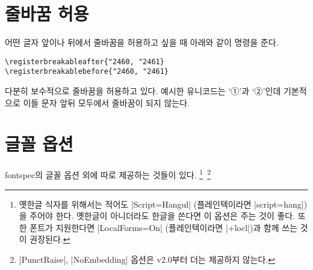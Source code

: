 \documentclass[a4paper]{article}
\def\luatex{\hologo{LuaTeX}}
\def\logoko{\textsf{k}\kern-.0625em\textit{o}}
\def\luatexko{\luatex-\logoko}
\begin{document}
\section{줄바꿈 허용}\label{sec:break}

어떤 글자 앞이나 뒤에서 줄바꿈을 허용하고 싶을 때 아래와 같이 명령을 준다.%
\pkgkwd*{\registerbreakableafter}%
\pkgkwd*{\registerbreakablebefore}
\begin{verbatim}
\registerbreakableafter{"2460, "2461}
\registerbreakablebefore{"2460, "2461}
\end{verbatim}
 다분히 보수적으로 줄바꿈을 허용하고 있다.
예시한 유니코드는 `①'과 `②'인데 기본적으로
이들 문자 앞뒤 모두에서 줄바꿈이 되지 않는다.

\section{글꼴 옵션}\label{sec:fontoption}

fontspec의 글꼴 옵션 외에  따로 제공하는 것들이 있다.%
\footnote{%
  옛한글 식자를 위해서는 적어도 |Script=Hangul|
  (플레인텍이라면 |script=hang|)을 주어야 한다.
  옛한글이 아니더라도 한글을 쓴다면 이 옵션은 주는 것이 좋다.
  또한 폰트가 지원한다면 |LocalForms=On| (플레인텍이라면 |+locl|)과
  함께 쓰는 것이 권장된다. }\,%
\footnote{%
  |PunctRaise|, |NoEmbedding| 옵션은 v2.0부터 더는 제공하지 않는다. }

\def\hunmintxt{%
  \noindent\textbf{%
  世솅〮宗조ᇰ御ᅌᅥᆼ〮製졩〮訓훈〮民민正져ᇰ〮音ᅙᅳᆷ
  }\par
  製졩〮ᄂᆞᆫ〮글〮지ᅀᅳᆯ〮씨〮니〮御ᅌᅥᆼ〮製졩〮ᄂᆞᆫ〮님〯금〮지〯ᅀᅳ샨〮그〮리라〮訓훈〮은〮ᄀᆞᄅᆞ칠〮씨〮오〮民%
  민ᄋᆞᆫ〮百ᄇᆡᆨ〮姓셔ᇰ〮이〮오〮音ᅙᅳᆷ은〮소리〮니〮訓훈〮民%
  민正져ᇰ〮音ᅙᅳᆷ은〮百ᄇᆡᆨ〮姓셔ᇰ〮ᄀᆞᄅᆞ치〮시논〮正져ᇰ〮ᄒᆞᆫ소리〮라〮
  \par\medskip
  \noindent\textbf{%
  國귁〮之징語ᅌᅥᆼ〯音ᅙᅳᆷ이〮
  }\par
  國귁〮ᄋᆞᆫ〮나라〮히라〮之징ᄂᆞᆫ〮입〮겨〮지라〮語ᅌᅥᆼ〯는말〯ᄊᆞ미라〮
  \par
  나랏〮말〯ᄊᆞ미〮
  \par\medskip
  \noindent\textbf{%
  異잉〮乎ᅘᅩᆼ中듀ᇰ國귁〮ᄒᆞ〮야〮
  }\par
  異잉〮ᄂᆞᆫ〮다ᄅᆞᆯ씨라乎ᅘᅩᆼᄂᆞᆫ〮아〯모〮그ᅌᅦᄒᆞ〮논겨〮체ᄡᅳ〮는字ᄍᆞᆼ〮ㅣ라〮中듀ᇰ國귁〮ᄋᆞᆫ〮%
  皇ᅘᅪᇰ帝뎽〮겨〯신나라〮히니〮우〮리〮나랏〮常쌰ᇰ談땀애〮江가ᇰ南남이〮라〮ᄒᆞ〮ᄂᆞ〮니라〮
  \par
  中듀ᇰ國귁〮에〮달아〮
}
\end{document}
